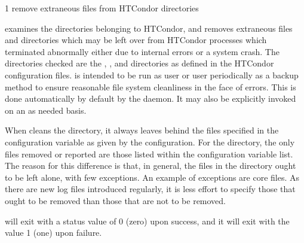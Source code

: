 \begin{ManPage}{\label{man-condor-preen}}{1}
{remove extraneous files from HTCondor directories}
\Synopsis {}


\Description 

 examines the directories belonging to HTCondor, 
and removes extraneous files and directories which may be left over from
HTCondor processes which terminated abnormally either due to internal errors or
a system crash. The directories checked are 
the , , and 
directories as defined in the HTCondor configuration files.  is
intended to be run as user  or user 
periodically as a backup
method to ensure reasonable file system cleanliness in the face of
errors. This is done automatically by default by the  daemon. 
It may also be explicitly invoked on an as needed basis.

When  cleans the  directory, it always leaves
behind the files specified in the configuration variable
 as given by the configuration.
For the  directory, the only files removed or reported are those
listed within the configuration variable  list.
The reason for this difference is that, in general,
the files in the  directory ought to be left alone,
with few exceptions.
An example of exceptions are core files.
As there are new log files introduced regularly,
it is less effort to specify those that ought to be removed
than those that are not to be removed.

\begin{Options}





\end{Options}

\ExitStatus

 will exit with a status value of 0 (zero) upon success,
and it will exit with the value 1 (one) upon failure.

\end{ManPage}
